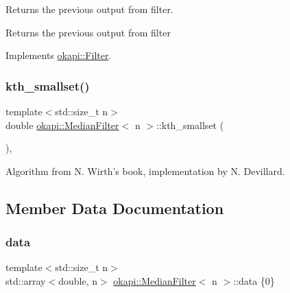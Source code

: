 Returns the previous output from filter.

\begin{DoxyReturn}{Returns}
the previous output from filter 
\end{DoxyReturn}


Implements \mbox{\hyperlink{classokapi_1_1Filter_a3469cd4bc108f8accf300d9f5cc9f42f}{okapi\+::\+Filter}}.

\mbox{\label{classokapi_1_1MedianFilter_afe9b963e054b89cbdc13ea1acaaa900b}} 
\subsubsection{\texorpdfstring{kth\_smallset()}{kth\_smallset()}}
{\footnotesize\ttfamily template$<$std\+::size\+\_\+t n$>$ \\
double \mbox{\hyperlink{classokapi_1_1MedianFilter}{okapi\+::\+Median\+Filter}}$<$ n $>$\+::kth\+\_\+smallset (\begin{DoxyParamCaption}{ }\end{DoxyParamCaption})\hspace{0.3cm}{\ttfamily [inline]}, {\ttfamily [protected]}}

Algorithm from N. Wirth’s book, implementation by N. Devillard. 

\subsection{Member Data Documentation}
\mbox{\label{classokapi_1_1MedianFilter_a9a6648a537ca4aac1095ee6de6e02806}} 
\subsubsection{\texorpdfstring{data}{data}}
{\footnotesize\ttfamily template$<$std\+::size\+\_\+t n$>$ \\
std\+::array$<$double, n$>$ \mbox{\hyperlink{classokapi_1_1MedianFilter}{okapi\+::\+Median\+Filter}}$<$ n $>$\+::data \{0\}\hspace{0.3cm}{\ttfamily [protected]}}

